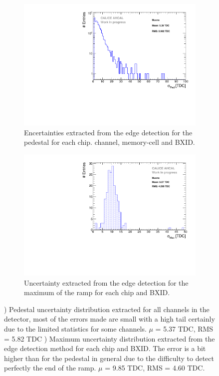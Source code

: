 \begin{figure}[thtbp!]
	\begin{subfigure}[t]{0.49\textwidth}
		\centering
		\includegraphics[width=1\linewidth]{../Thesis_Plots/Timing/Muons/Plots/PedestalErrorDistribution_AHCAL.pdf}
		\caption{Encertainties extracted from the edge detection for the pedestal for each chip. channel, memory-cell and BXID.} \label{fig:error_ped}
	\end{subfigure}
	\hfill
	\begin{subfigure}[t]{0.49\textwidth}
		\centering
		\includegraphics[width=1\linewidth]{../Thesis_Plots/Timing/Muons/Plots/MaxErrorDistribution_AHCAL.pdf}
		\caption{Uncertainty extracted from the edge detection for the maximum of the ramp for each chip and BXID.} \label{fig:error_max}
	\end{subfigure}
	\caption{) Pedestal uncertainty distribution extracted for all channels in the detector, most of the errors made are small with a high tail certainly due to the limited statistics for some channels. $\mu$ = 5.37 TDC, RMS = 5.82 TDC ) Maximum uncertainty distribution extracted from the edge detection method for each chip and BXID. The error is a bit higher than for the pedestal in general due to the difficulty to detect perfectly the end of the ramp. $\mu$ = 9.85 TDC, RMS = 4.60 TDC.}
\end{figure}

